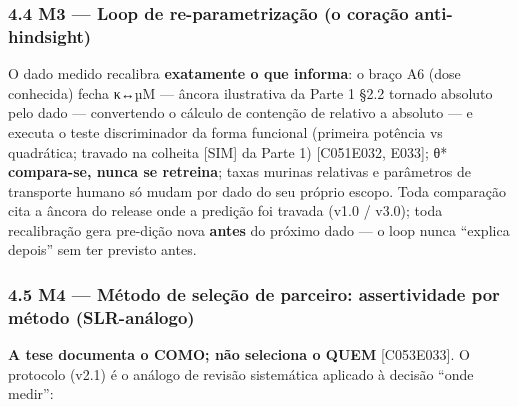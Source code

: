 \documentclass[
  10pt,
]{article}
\begin{document}
\hypertarget{m3-loop-de-re-parametrizauxe7uxe3o-o-corauxe7uxe3o-anti-hindsight}{%
\subsubsection{4.4 M3 --- Loop de re-parametrização (o coração
anti-hindsight)}\label{m3-loop-de-re-parametrizauxe7uxe3o-o-corauxe7uxe3o-anti-hindsight}}

O dado medido recalibra \textbf{exatamente o que informa}: o braço A6
(dose conhecida) fecha κ↔µM --- âncora ilustrativa da Parte 1 §2.2
tornado absoluto pelo dado --- convertendo o cálculo de contenção de
relativo a absoluto --- e executa o teste discriminador da forma
funcional (primeira potência vs quadrática; travado na colheita
{[}SIM{]} da Parte 1) {[}C051\textbar E032, E033{]}; θ*
\textbf{compara-se, nunca se retreina}; taxas murinas relativas e
parâmetros de transporte humano só mudam por dado do seu próprio escopo.
Toda comparação cita a âncora do release onde a predição foi travada
(v1.0 / v3.0); toda recalibração gera pre-dição nova \textbf{antes} do
próximo dado --- o loop nunca ``explica depois'' sem ter previsto antes.

\hypertarget{m4-muxe9todo-de-seleuxe7uxe3o-de-parceiro-assertividade-por-muxe9todo-slr-anuxe1logo}{%
\subsubsection{4.5 M4 --- Método de seleção de parceiro: assertividade
por método
(SLR-análogo)}\label{m4-muxe9todo-de-seleuxe7uxe3o-de-parceiro-assertividade-por-muxe9todo-slr-anuxe1logo}}

\textbf{A tese documenta o COMO; não seleciona o QUEM}
{[}C053\textbar E033{]}. O protocolo (v2.1) é o análogo de revisão
sistemática aplicado à decisão ``onde medir'':
\end{document}
